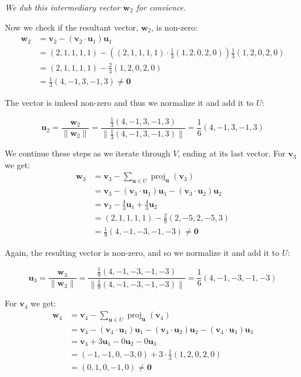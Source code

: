\documentclass{article}
\begin{document}
\textit{We dub this intermediary vector $\mathbf w_2$ for convience.}

Now we check if the resultant vector, $\mathbf w_2$, is non-zero:
\begin{align*}
  \mathbf w_2&=\mathbf v_2-(\mathbf v_2\cdot\mathbf u_1)\mathbf u_1\\
  &=(2, 1, 1, 1, 1)-((2, 1, 1, 1, 1)\cdot \frac{1}{3}(1, 2, 0, 2, 0))\frac{1}{3}(1, 2, 0, 2, 0)\\
  &=(2, 1, 1, 1, 1)-\frac{2}{3}(1, 2, 0, 2, 0)\\
  &=\frac{1}{3}(4, -1, 3, -1, 3)\not=\mathbf 0
\end{align*}

The vector is indeed non-zero and thus we normalize it and add it to $U$:

$$\mathbf u_2=\frac{\mathbf w_2}{\|\mathbf w_2\|}=\frac{\frac{1}{3}(4, -1, 3, -1, 3)}{\|\frac{1}{3}(4, -1, 3, -1, 3)\|}=\boxed{\frac{1}{6}(4, -1, 3, -1, 3)}$$

We continue these steps as we iterate through $V$, ending at its last vector. For $\mathbf v_3$ we get:
\begin{align*}
  \mathbf w_3 &=\mathbf v_3-\sum_{\mathbf u\in U}\operatorname{proj}_\mathbf u(\mathbf v_3)\\
  &=\mathbf v_3-(\mathbf v_3\cdot\mathbf u_1)\mathbf u_1-(\mathbf v_3\cdot\mathbf u_2)\mathbf u_2\\
  &=\mathbf v_3-\frac{4}{3}\mathbf u_1+\frac{4}{3}\mathbf u_2\\
  &=(2, 1, 1, 1, 1)-\frac{2}{9}(2,-5,2,-5,3)\\
  &= \frac{1}{9}(4,-1,-3,-1,-3)\not=\mathbf0
\end{align*}

Again, the resulting vector is non-zero, and so we normalize it and add it to $U$:

$$\mathbf u_3=\frac{\mathbf w_3}{\|\mathbf w_3\|}=\frac{\frac{1}{9}(4,-1,-3,-1,-3)}{\|\frac{1}{9}(4,-1,-3,-1,-3)\|}=\boxed{\frac{1}{6}(4,-1,-3,-1,-3)}$$

For $\mathbf v_4$ we get:
\begin{align*}
  \mathbf w_4 &=\mathbf v_4-\sum_{\mathbf u\in U}\operatorname{proj}_\mathbf u(\mathbf v_4)\\
  &=\mathbf v_4-(\mathbf v_4\cdot\mathbf u_1)\mathbf u_1-(\mathbf v_4\cdot\mathbf u_2)\mathbf u_2-(\mathbf v_4\cdot\mathbf u_3)\mathbf u_3\\
  &=\mathbf v_4+3\mathbf u_1-0\mathbf u_2-0\mathbf u_3\\
  &=(-1, -1, 0, -3, 0)+3\cdot\frac{1}{3}(1, 2, 0, 2, 0)\\
  &= (0,1,0,-1,0)\not=\mathbf0
\end{align*}
\end{document}
